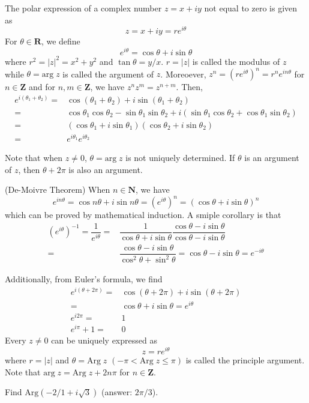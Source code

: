 \begin{defi}
The polar expression of a complex number $z=x+iy$ not equal to zero is given as
\[z=x+iy=re^{i\theta }\]
For $\theta \in {\bm R}$, we define
\[e^{i\theta }=\cos \theta +i\sin \theta \]
where $r^2=|z|^2=x^2+y^2$ and $\tan \theta =y/x$. $r=|z|$ is called the modulus of $z$ while $\theta =\mathrm{arg}\;z$ is called the argument of $z$. Moreoever, $z^{n}=(re^{i\theta })^{n}=r^{n}e^{in \theta }$ for $n\in {\bm Z}$ and for $n,m\in {\bm Z}$, we have $z^{n}z^{m}=z^{n+m}$. Then,
\begin{align*}
	e^{i(\theta_1+\theta_2)}=& \cos (\theta_1+\theta_2)+i\sin (\theta_1+\theta_2)\\
	=&\cos \theta_1\cos \theta_2-\sin \theta_1 \sin \theta_2+i(\sin \theta_1\cos \theta_2+\cos \theta_1\sin \theta_2)\\
	=&(\cos\theta_1+i\sin \theta_1)(\cos\theta_2+i\sin \theta_2)\\
	=&e^{i\theta_1}e^{i\theta_2}
\end{align*}
\end{defi}
\vspace{2ex}
Note that when $z\ne 0$, $\theta =\mathrm{arg}\;z$ is not uniquely determined. If $\theta$ is an argument of $z$, then $\theta +2\pi $ is also an argument.
\\
\begin{thm}
(De-Moivre Theorem) When $n\in {\bm N}$, we have
\[e^{in \theta }=\cos n\theta +i\sin n\theta =(e^{i\theta })^{n}=(\cos \theta +i\sin \theta )^{n}\]
which can be proved by mathematical induction. A smiple corollary is that
\begin{align*}
	(e^{i\theta })^{-1}=\dfrac{1}{e^{i\theta }}=&\dfrac{1}{\cos \theta +i\sin \theta }\dfrac{\cos \theta -i\sin \theta }{\cos \theta -i\sin \theta }\\
	=&\dfrac{\cos \theta -i\sin \theta }{\cos ^2\theta +\sin ^2\theta }=\cos \theta -i\sin \theta =e^{-i\theta}
\end{align*}

\end{thm}
\vspace{2ex}
Additionally, from Euler's formula, we find
\begin{align*}
	e^{i(\theta +2\pi )}=&\cos (\theta +2\pi )+i\sin (\theta +2\pi )\\
=&\cos \theta +i\sin \theta =e^{i\theta }\\
e^{i2\pi }=&1\\
e^{i\pi }+1=&0
\end{align*}
Every $z\ne 0$ can be uniquely expressed as
\[z=re^{i\theta }\]
where $r=|z|$ and $\theta =\mathrm{Arg}\;z$ $(-\pi <\mathrm{Arg}\;z\leq \pi )$ is called the principle argument. Note that $\mathrm{arg}\;z=\mathrm{Arg}\;z+2n\pi $ for $n\in {\bm Z}$.
\\
\begin{ex}
Find $\mathrm{Arg}(-{2}/{1+i\sqrt{3}})$ (answer: $2\pi /3$).
\end{ex}
\vspace{2ex}



\vspace{2ex}

